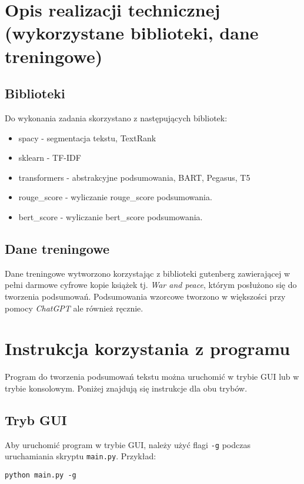 \documentclass{article}
\begin{document}
\section{Opis realizacji technicznej (wykorzystane biblioteki, dane treningowe)}
\subsection{Biblioteki}
Do wykonania zadania skorzystano z następujących bibliotek:
\begin{itemize}
	\item spacy - segmentacja tekstu, TextRank
	\item sklearn - TF-IDF
	\item transformers - abstrakcyjne podsumowania, BART, Pegasus, T5
	\item rouge\_score - wyliczanie rouge\_score podsumowania.
	\item bert\_score - wyliczanie bert\_score podsumowania.
\end{itemize}
\subsection{Dane treningowe}
Dane treningowe wytworzono korzystając z biblioteki gutenberg \cite{gutenberg}
zawierającej w pełni darmowe cyfrowe kopie książek tj. \textit{War and peace}, którym
posłużono się do tworzenia podsumowań. Podsumowania wzorcowe tworzono w większości przy pomocy
\textit{ChatGPT} ale również ręcznie.

\section{Instrukcja korzystania z programu}
Program do tworzenia podsumowań tekstu można uruchomić w trybie GUI lub w trybie konsolowym. Poniżej znajdują się instrukcje dla obu trybów.

\subsection{Tryb GUI}
Aby uruchomić program w trybie GUI, należy użyć flagi \texttt{-g} podczas uruchamiania skryptu \texttt{main.py}. Przykład:
\begin{verbatim}
python main.py -g
\end{verbatim}
\end{document}
